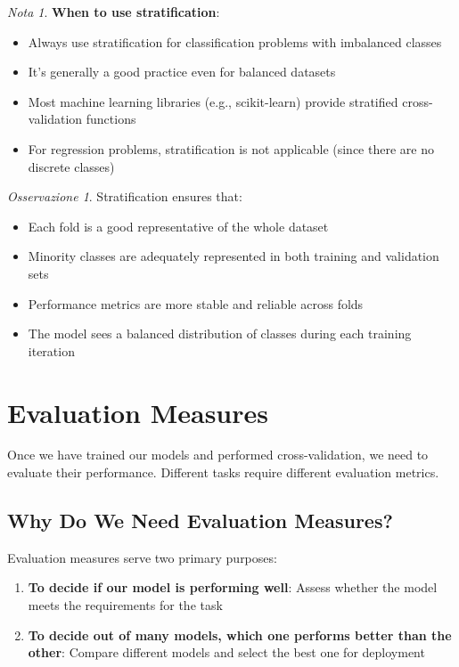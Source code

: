 \documentclass[11pt,a4paper]{article}
\theoremstyle{definition}
\theoremstyle{plain}
\theoremstyle{remark}
\newtheorem*{remark}{Nota}
\newtheorem*{observation}{Osservazione}
\begin{document}
\begin{remark}
\textbf{When to use stratification}:
\begin{itemize}
    \item Always use stratification for classification problems with imbalanced classes
    \item It's generally a good practice even for balanced datasets
    \item Most machine learning libraries (e.g., scikit-learn) provide stratified cross-validation functions
    \item For regression problems, stratification is not applicable (since there are no discrete classes)
\end{itemize}
\end{remark}

\begin{observation}
Stratification ensures that:
\begin{itemize}
    \item Each fold is a good representative of the whole dataset
    \item Minority classes are adequately represented in both training and validation sets
    \item Performance metrics are more stable and reliable across folds
    \item The model sees a balanced distribution of classes during each training iteration
\end{itemize}
\end{observation}

\section{Evaluation Measures}

Once we have trained our models and performed cross-validation, we need to evaluate their performance. Different tasks require different evaluation metrics.

\subsection{Why Do We Need Evaluation Measures?}

Evaluation measures serve two primary purposes:

\begin{enumerate}
    \item \textbf{To decide if our model is performing well}: Assess whether the model meets the requirements for the task
    
    \item \textbf{To decide out of many models, which one performs better than the other}: Compare different models and select the best one for deployment
\end{enumerate}
\end{document}
